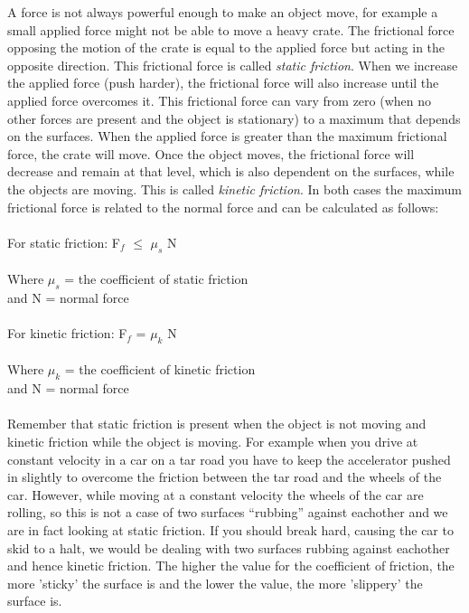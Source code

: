 A force is not always powerful enough to make an object move, for example a small applied force might not be able to move a heavy crate. The frictional force opposing the motion of the crate is equal to the applied force but acting in the opposite direction. This frictional force is called \emph{static friction}. When we increase the applied force (push harder), the frictional force will also increase until the applied force overcomes it. This frictional force can vary from zero (when no other forces are present and the object is stationary) to a maximum that depends on the surfaces. When the applied force is greater than the maximum frictional force, the crate will move. Once the object moves, the frictional force will decrease and remain at that level, which is also dependent on the surfaces, while the objects are moving. This is called \emph{kinetic friction}. In both cases the maximum frictional force is related to the normal force and can be calculated as follows:\\
\\
For static friction: F$_f$ $\leq$ $\mu_s$ N\\
\\
Where $\mu_s$ = the coefficient of static friction\\
and N = normal force\\
\\
For kinetic friction: F$_f$ = $\mu_k$ N\\
\\
Where $\mu_k$ = the coefficient of kinetic friction\\
and N = normal force\\
\\
Remember that static friction is present when the object is not moving and kinetic friction while the object is moving. For example when you drive at constant velocity in a car on a tar road you have to keep the accelerator pushed in slightly to overcome the friction between the tar road and the wheels of the car. However, while moving at a constant velocity the wheels of the car are rolling, so this is not a case of two surfaces ``rubbing'' against eachother and we are in fact looking at static friction. If you should break hard, causing the car to skid to a halt, we would be dealing with two surfaces rubbing against eachother and hence kinetic friction. The higher the value for the coefficient of friction, the more 'sticky' the surface is and the lower the value, the more 'slippery' the surface is.\\

